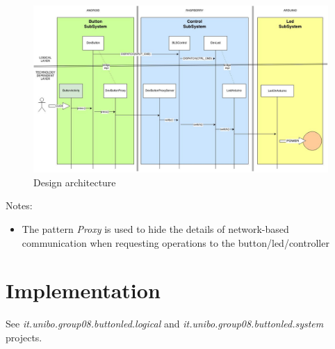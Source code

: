 \documentclass{article}
\newcommand{\labelsec}[1]{\label{sec:#1}}
\begin{document}
\begin{figure}[H]
    \centering
     \includegraphics[scale=0.42]{img/BLS-FullDistribHetherogeneousV2.jpg}
    \caption{Design architecture}
    \label{fig:designarch}
\end{figure}


Notes:

\begin{itemize}
  \item The pattern \emph{Proxy} is used to hide the details of network-based
  communication when requesting operations to the button/led/controller
\end{itemize}


\section{Implementation}
\labelsec{Implementation}

 See \emph{it.unibo.group08.buttonled.logical} and 
 \emph{it.unibo.group08.buttonled.system} projects.

\end{document}

